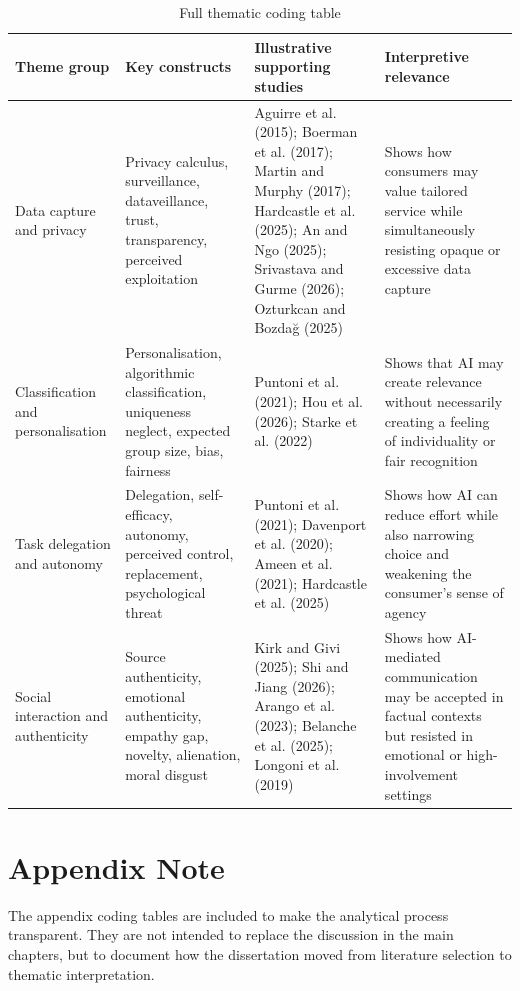 \begin{table}[h!]
\centering
\caption{Full thematic coding table}
\begin{tabular}{p{2.8cm}p{3.4cm}p{4.4cm}p{4cm}}
\toprule
\textbf{Theme group} & \textbf{Key constructs} & \textbf{Illustrative supporting studies} & \textbf{Interpretive relevance} \\
\midrule
Data capture and privacy & Privacy calculus, surveillance, dataveillance, trust, transparency, perceived exploitation & Aguirre et al. (2015); Boerman et al. (2017); Martin and Murphy (2017); Hardcastle et al. (2025); An and Ngo (2025); Srivastava and Gurme (2026); Ozturkcan and Bozda{\u{g}} (2025) & Shows how consumers may value tailored service while simultaneously resisting opaque or excessive data capture \\
\midrule
Classification and personalisation & Personalisation, algorithmic classification, uniqueness neglect, expected group size, bias, fairness & Puntoni et al. (2021); Hou et al. (2026); Starke et al. (2022) & Shows that AI may create relevance without necessarily creating a feeling of individuality or fair recognition \\
\midrule
Task delegation and autonomy & Delegation, self-efficacy, autonomy, perceived control, replacement, psychological threat & Puntoni et al. (2021); Davenport et al. (2020); Ameen et al. (2021); Hardcastle et al. (2025) & Shows how AI can reduce effort while also narrowing choice and weakening the consumer's sense of agency \\
\midrule
Social interaction and authenticity & Source authenticity, emotional authenticity, empathy gap, novelty, alienation, moral disgust & Kirk and Givi (2025); Shi and Jiang (2026); Arango et al. (2023); Belanche et al. (2025); Longoni et al. (2019) & Shows how AI-mediated communication may be accepted in factual contexts but resisted in emotional or high-involvement settings \\
\bottomrule
\end{tabular}
\end{table}

\section{Appendix Note}
The appendix coding tables are included to make the analytical process transparent. They are not intended to replace the discussion in the main chapters, but to document how the dissertation moved from literature selection to thematic interpretation.
